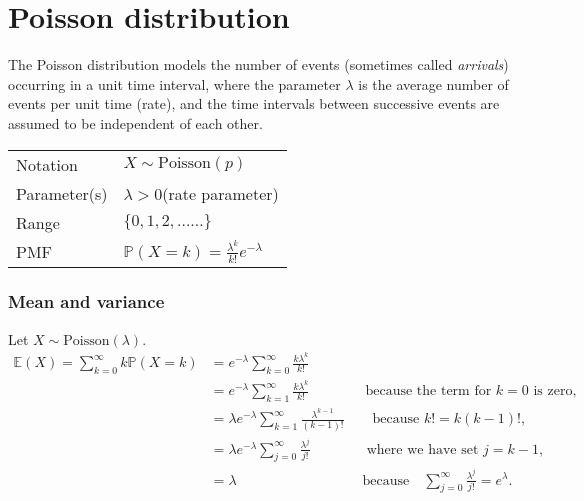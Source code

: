 \documentclass[lecture]{csm}
\newcommand{\prob}{\mathbb{P}}
\newcommand{\expe}{\mathbb{E}}
\begin{document}
\section{Poisson distribution}
The Poisson distribution models the number of events (sometimes called \emph{arrivals}) occurring in a unit time interval, where the parameter $\lambda$ is the average number of events per unit time (rate), and the time intervals between successive events are assumed to be independent of each other. 

\begin{center}
\begin{tabular}{ll}\hline
Notation			& $X\sim\text{Poisson}(p)$ \\
Parameter(s)		& $\lambda > 0$\quad (rate parameter) \\
Range				& $\{0,1,2,\ldots\ldots\}$ \\
PMF				& $\prob(X=k) = \displaystyle\frac{\lambda^k}{k!}e^{-\lambda}$ \\[2ex] \hline
\end{tabular}
\end{center}

\subsubsection*{Mean and variance}

Let $X\sim\text{Poisson}(\lambda)$.
\begin{align*}
\expe(X) = \sum_{k=0}^\infty k \prob(X=k)
	& = e^{-\lambda}\sum_{k=0}^\infty \frac{k\lambda^k}{k!} \\
	& = e^{-\lambda}\sum_{k=1}^\infty \frac{k\lambda^k}{k!} \qquad\qquad\text{because the term for $k=0$ is zero,}\\
	& = \lambda e^{-\lambda}\sum_{k=1}^\infty \frac{\lambda^{k-1}}{(k-1)!} \qquad\text{because $k!=k(k-1)!$,}\\
	& = \lambda e^{-\lambda}\sum_{j=0}^\infty \frac{\lambda^j}{j!} \qquad\qquad\text{where we have set $j=k-1$,}\\
	& = \lambda \quad\qquad\qquad\qquad\qquad\text{because}\quad \sum_{j=0}^\infty \frac{\lambda^j}{j!}= e^{\lambda}.
\end{align*}
\end{document}
